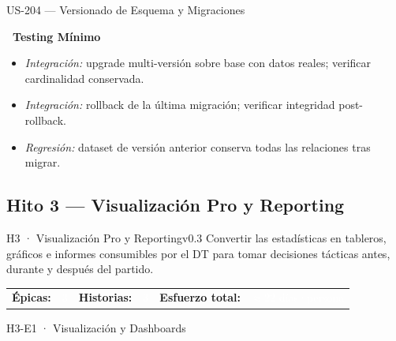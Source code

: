 \documentclass[11pt,a4paper]{article}
\newcommand{\usfield}[2][\;]{%
  \par\vspace{5pt}%
  {\small\textbf{\textcolor{primary}{#2}}}\par\vspace{2pt}%
}
\begin{document}
\begin{uscard}{US-204 — Versionado de Esquema y Migraciones}
\usfield{\faFlask\ Testing Mínimo}
\begin{itemize}[nosep, leftmargin=1.6em]
  \item \textit{Integración:} upgrade multi-versión sobre base con datos reales; verificar cardinalidad conservada.
  \item \textit{Integración:} rollback de la última migración; verificar integridad post-rollback.
  \item \textit{Regresión:} dataset de versión anterior conserva todas las relaciones tras migrar.
\end{itemize}

\end{uscard}

\subsection{Hito 3 — Visualización Pro y Reporting}

\begin{hitobox}{H3 · Visualización Pro y Reporting}{v0.3}
\small\textcolor{accentlight}{%
  Convertir las estadísticas en tableros, gráficos e informes consumibles por el DT
  para tomar decisiones tácticas antes, durante y después del partido.
}
\par\vspace{4pt}
\begin{tabular}{@{}lllll@{}}
  \textcolor{accentlight}{\small\textbf{Épicas:}} & \textcolor{white}{\small 3} &
  \textcolor{accentlight}{\small\textbf{Historias:}} & \textcolor{white}{\small 3} &
  \textcolor{accentlight}{\small\textbf{Esfuerzo total:}} \textcolor{white}{\small~$\approx$22 días·persona}
\end{tabular}
\end{hitobox}

\begin{epicbox}{H3-E1 · Visualización y Dashboards}
\end{epicbox}
\end{document}
